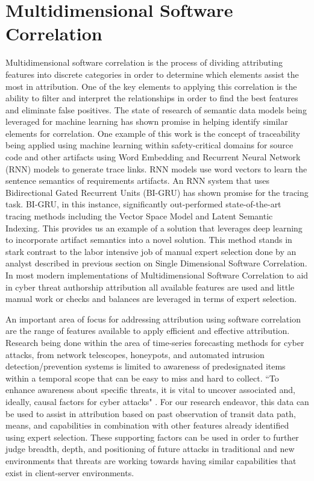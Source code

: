 \documentclass[12pt]{report}
\begin{document}
\section{Multidimensional Software Correlation}
Multidimensional software correlation is the process of dividing attributing features into discrete categories in order to determine which elements assist the most in attribution.  One of the key elements to applying this correlation is the ability to filter and interpret the relationships in order to find the best features and eliminate false positives.  The state of research of semantic data models being leveraged for machine learning has shown promise in helping identify similar elements for correlation.  One example of this work is the concept of traceability being applied using machine learning within safety-critical domains for source code and other artifacts using Word Embedding and Recurrent Neural Network (RNN) models to generate trace links.  RNN models use word vectors to learn the sentence semantics of requirements artifacts.  An RNN system that uses Bidirectional Gated Recurrent Units (BI-GRU) has shown promise for the tracing task.  \cite{saha2019integrating}  BI-GRU, in this instance, significantly out-performed state-of-the-art tracing methods including the Vector Space Model and Latent Semantic Indexing.   This provides us an example of a solution that leverages deep learning to incorporate artifact semantics into a novel solution. \cite{guo2017semantically}  This method stands in stark contrast to the labor intensive job of manual expert selection done by an analyst described in previous section on Single Dimensional Software Correlation.  In most modern implementations of Multidimensional Software Correlation to aid in cyber threat authorship attribution all available features are used and little manual work or checks and balances are leveraged in terms of expert selection. 

An important area of focus for addressing attribution using software correlation are the range of features available to apply efficient and effective attribution.  Research being done within the area of time-series forecasting methods for cyber attacks, from network telescopes, honeypots, and automated intrusion detection/prevention systems is limited to awareness of predesignated items within a temporal scope that can be easy to miss and hard to collect.  ``To enhance awareness about specific threats, it is vital to uncover associated and, ideally, causal factors for cyber attacks"  \cite{DBLP:journals/corr/BakdashHZMTSHD17}.  For our research endeavor, this data can be used to assist in attribution based on past observation of transit data path, means, and capabilities in combination with other features already identified using expert selection.  These supporting factors can be used in order to further judge breadth, depth, and positioning of future attacks in traditional and new environments that threats are working towards having similar capabilities that exist in client-server environments.
\end{document}
